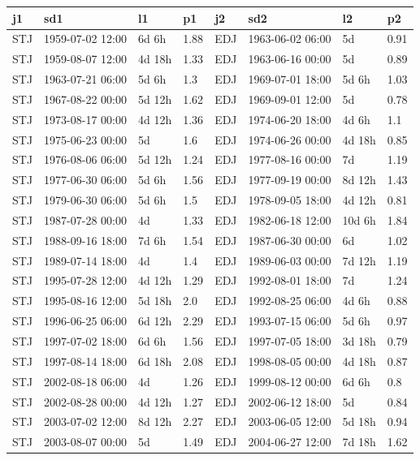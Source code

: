 \begin{tabular}{l}
\toprule
j1 & sd1 & l1 & p1 & j2 & sd2 & l2 & p2 \\
\midrule
STJ & 1959-07-02 12:00 & 6d 6h & 1.88 & EDJ & 1963-06-02 06:00 & 5d & 0.91 \\
STJ & 1959-08-07 12:00 & 4d 18h & 1.33 & EDJ & 1963-06-16 00:00 & 5d & 0.89 \\
STJ & 1963-07-21 06:00 & 5d 6h & 1.3 & EDJ & 1969-07-01 18:00 & 5d 6h & 1.03 \\
STJ & 1967-08-22 00:00 & 5d 12h & 1.62 & EDJ & 1969-09-01 12:00 & 5d & 0.78 \\
STJ & 1973-08-17 00:00 & 4d 12h & 1.36 & EDJ & 1974-06-20 18:00 & 4d 6h & 1.1 \\
STJ & 1975-06-23 00:00 & 5d & 1.6 & EDJ & 1974-06-26 00:00 & 4d 18h & 0.85 \\
STJ & 1976-08-06 06:00 & 5d 12h & 1.24 & EDJ & 1977-08-16 00:00 & 7d & 1.19 \\
STJ & 1977-06-30 06:00 & 5d 6h & 1.56 & EDJ & 1977-09-19 00:00 & 8d 12h & 1.43 \\
STJ & 1979-06-30 06:00 & 5d 6h & 1.5 & EDJ & 1978-09-05 18:00 & 4d 12h & 0.81 \\
STJ & 1987-07-28 00:00 & 4d & 1.33 & EDJ & 1982-06-18 12:00 & 10d 6h & 1.84 \\
STJ & 1988-09-16 18:00 & 7d 6h & 1.54 & EDJ & 1987-06-30 00:00 & 6d & 1.02 \\
STJ & 1989-07-14 18:00 & 4d & 1.4 & EDJ & 1989-06-03 00:00 & 7d 12h & 1.19 \\
STJ & 1995-07-28 12:00 & 4d 12h & 1.29 & EDJ & 1992-08-01 18:00 & 7d & 1.24 \\
STJ & 1995-08-16 12:00 & 5d 18h & 2.0 & EDJ & 1992-08-25 06:00 & 4d 6h & 0.88 \\
STJ & 1996-06-25 06:00 & 6d 12h & 2.29 & EDJ & 1993-07-15 06:00 & 5d 6h & 0.97 \\
STJ & 1997-07-02 18:00 & 6d 6h & 1.56 & EDJ & 1997-07-05 18:00 & 3d 18h & 0.79 \\
STJ & 1997-08-14 18:00 & 6d 18h & 2.08 & EDJ & 1998-08-05 00:00 & 4d 18h & 0.87 \\
STJ & 2002-08-18 06:00 & 4d & 1.26 & EDJ & 1999-08-12 00:00 & 6d 6h & 0.8 \\
STJ & 2002-08-28 00:00 & 4d 12h & 1.27 & EDJ & 2002-06-12 18:00 & 5d & 0.84 \\
STJ & 2003-07-02 12:00 & 8d 12h & 2.27 & EDJ & 2003-06-05 12:00 & 5d 18h & 0.94 \\
STJ & 2003-08-07 00:00 & 5d & 1.49 & EDJ & 2004-06-27 12:00 & 7d 18h & 1.62 \\

\end{tabular}
